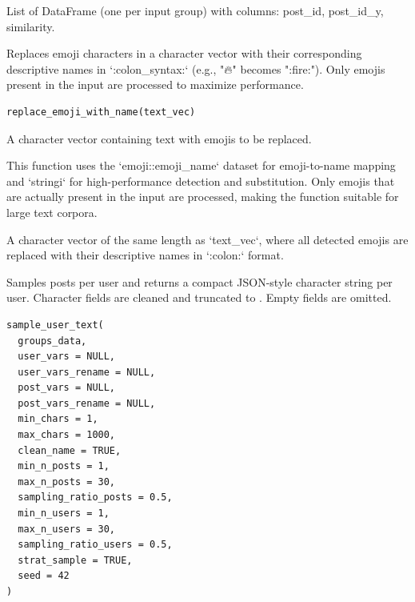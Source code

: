 \documentclass[a4paper]{book}
\begin{document}
%
\begin{Value}
List of DataFrame (one per input group) with columns: post\_id, post\_id\_y, similarity.
\end{Value}
%
\begin{Description}
Replaces emoji characters in a character vector with their corresponding
descriptive names in `:colon\_syntax:` (e.g., "🔥" becomes ":fire:").
Only emojis present in the input are processed to maximize performance.
\end{Description}
%
\begin{Usage}
\begin{verbatim}
replace_emoji_with_name(text_vec)
\end{verbatim}
\end{Usage}
%
\begin{Arguments}
\begin{ldescription}
\item[\code{text\_vec}] A character vector containing text with emojis to be replaced.
\end{ldescription}
\end{Arguments}
%
\begin{Details}
This function uses the `emoji::emoji\_name` dataset for emoji-to-name mapping
and `stringi` for high-performance detection and substitution.
Only emojis that are actually present in the input are processed, making
the function suitable for large text corpora.
\end{Details}
%
\begin{Value}
A character vector of the same length as `text\_vec`, where all detected
emojis are replaced with their descriptive names in `:colon:` format.
\end{Value}
%
\begin{Description}
Samples posts per user and returns a compact JSON-style character string per user.
Character fields are cleaned and truncated to . Empty fields are omitted.
\end{Description}
%
\begin{Usage}
\begin{verbatim}
sample_user_text(
  groups_data,
  user_vars = NULL,
  user_vars_rename = NULL,
  post_vars = NULL,
  post_vars_rename = NULL,
  min_chars = 1,
  max_chars = 1000,
  clean_name = TRUE,
  min_n_posts = 1,
  max_n_posts = 30,
  sampling_ratio_posts = 0.5,
  min_n_users = 1,
  max_n_users = 30,
  sampling_ratio_users = 0.5,
  strat_sample = TRUE,
  seed = 42
)
\end{verbatim}
\end{Usage}
\end{document}
